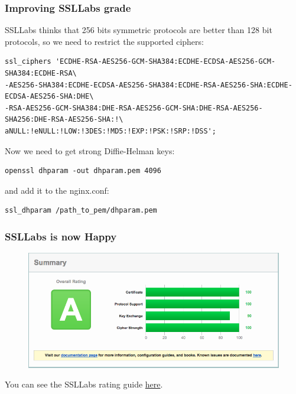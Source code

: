 \documentclass{beamer}
\begin{document}
\begin{frame}[fragile]
\frametitle{Improving SSLLabs grade}
SSLLabs thinks that 256 bits symmetric protocols are better than 128 bit protocols, so we need to restrict the supported ciphers:
\begin{verbatim}
ssl_ciphers 'ECDHE-RSA-AES256-GCM-SHA384:ECDHE-ECDSA-AES256-GCM-SHA384:ECDHE-RSA\
-AES256-SHA384:ECDHE-ECDSA-AES256-SHA384:ECDHE-RSA-AES256-SHA:ECDHE-ECDSA-AES256-SHA:DHE\
-RSA-AES256-GCM-SHA384:DHE-RSA-AES256-GCM-SHA:DHE-RSA-AES256-SHA256:DHE-RSA-AES256-SHA:!\
aNULL:!eNULL:!LOW:!3DES:!MD5:!EXP:!PSK:!SRP:!DSS';
\end{verbatim}
\end{frame}

\begin{frame}[fragile]
Now we need to get strong Diffie-Helman keys:
\begin{verbatim}
openssl dhparam -out dhparam.pem 4096
\end{verbatim}
and add it to the nginx.conf:
\begin{verbatim}
ssl_dhparam /path_to_pem/dhparam.pem
\end{verbatim}
\end{frame}

\begin{frame}[fragile]
\frametitle{SSLLabs is now Happy}
\begin{figure}
\includegraphics[scale=0.25]{figures/SSLLabsA.png}
\end{figure}
You can see the SSLLabs rating guide \href{https://www.ssllabs.com/downloads/SSL_Server_Rating_Guide.pdf}{here}.
\end{frame}
\end{document}
